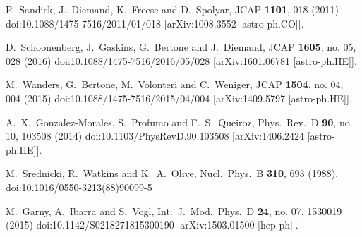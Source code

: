 \documentclass[11pt]{article}
\begin{document}
\begin{thebibliography}{99}
  P.~Sandick, J.~Diemand, K.~Freese and D.~Spolyar,
  JCAP {\bf 1101}, 018 (2011)
  doi:10.1088/1475-7516/2011/01/018
  [arXiv:1008.3552 [astro-ph.CO]].
  
  D.~Schoonenberg, J.~Gaskins, G.~Bertone and J.~Diemand,
  JCAP {\bf 1605}, no. 05, 028 (2016)
  doi:10.1088/1475-7516/2016/05/028
  [arXiv:1601.06781 [astro-ph.HE]].
  
  
  M.~Wanders, G.~Bertone, M.~Volonteri and C.~Weniger,
  JCAP {\bf 1504}, no. 04, 004 (2015)
  doi:10.1088/1475-7516/2015/04/004
  [arXiv:1409.5797 [astro-ph.HE]].
  
  A.~X.~Gonzalez-Morales, S.~Profumo and F.~S.~Queiroz,
  Phys.\ Rev.\ D {\bf 90}, no. 10, 103508 (2014)
  doi:10.1103/PhysRevD.90.103508
  [arXiv:1406.2424 [astro-ph.HE]].
  
  M.~Srednicki, R.~Watkins and K.~A.~Olive,
  Nucl.\ Phys.\ B {\bf 310}, 693 (1988).
  doi:10.1016/0550-3213(88)90099-5
  
  
  M.~Garny, A.~Ibarra and S.~Vogl,
  Int.\ J.\ Mod.\ Phys.\ D {\bf 24}, no. 07, 1530019 (2015)
  doi:10.1142/S0218271815300190
  [arXiv:1503.01500 [hep-ph]].
  

\end{thebibliography}
\end{document}

